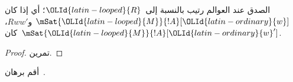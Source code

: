 \documentclass[../../../include/open-logic-section]{subfiles}
\begin{document}
\begin{prop}
  الصدق عند العوالم رتيب بالنسبة إلى~${\OLId{latin-looped}{R}}$؛ أي إذا كان
  $\mSat{{\OLId{latin-looped}{M}}}{!A}[{\OLId{latin-ordinary}{w}}]$ و$Rww'$، كان~$\mSat{{\OLId{latin-looped}{M}}}{!A}[{\OLId{latin-ordinary}{w}}']$.
\end{prop}

\begin{proof}
  تمرين.
\end{proof}

\begin{prob}
  أقم برهان~.
\end{prob}
\end{document}
